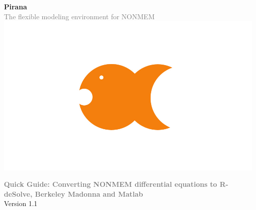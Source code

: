 \documentclass[a4,10pt]{article} \usepackage[pdftex]{graphicx}
\renewcommand{\emph}[1]{\textbf{\textcolor{Grey}{#1}}}
\begin{document}
{\centering
  \vspace{-100pt}
  \textbf{
    \textcolor{PiranaOrange}{\Large Pirana}
  }\\
  \vspace{5pt} \scriptsize \textcolor{Grey}{The flexible modeling
    environment for NONMEM} \\ \normalsize
  \vspace{12pt}
  \hspace{5pt}\includegraphics[scale=0.14]{images/pirana_logo.jpg}\\
  \vspace{18pt}

  {\large
    \emph{Quick Guide: Converting NONMEM differential equations to R-deSolve, Berkeley Madonna and Matlab }  \vspace{10pt} \\
        Version 1.1
  }

}
\vspace{25pt}


\end{document}
